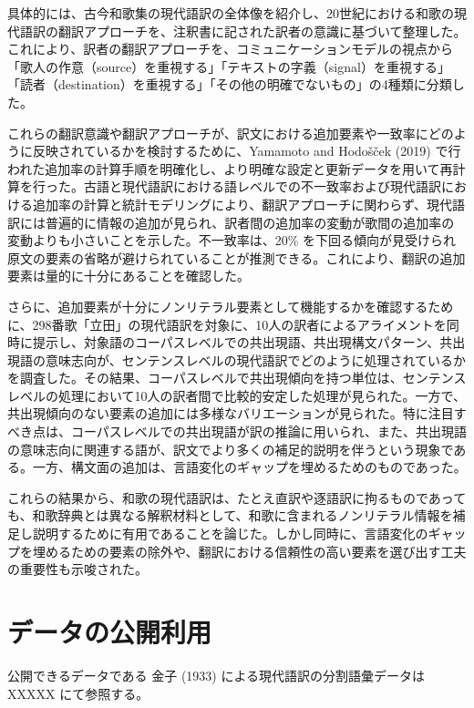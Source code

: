 \documentclass[
  letterpaper,
  DIV=11,
  numbers=noendperiod]{scrartcl}
\begin{document}
具体的には、古今和歌集の現代語訳の全体像を紹介し、20世紀における和歌の現代語訳の翻訳アプローチを、注釈書に記された訳者の意識に基づいて整理した。これにより、訳者の翻訳アプローチを、コミュニケーションモデルの視点から「歌人の作意（source）を重視する」「テキストの字義（signal）を重視する」「読者（destination）を重視する」「その他の明確でないもの」の4種類に分類した。

これらの翻訳意識や翻訳アプローチが、訳文における追加要素や一致率にどのように反映されているかを検討するために、Yamamoto
and Hodošček (2019)
で行われた追加率の計算手順を明確化し、より明確な設定と更新データを用いて再計算を行った。古語と現代語訳における語レベルでの不一致率および現代語訳における追加率の計算と統計モデリングにより、翻訳アプローチに関わらず、現代語訳には普遍的に情報の追加が見られ、訳者間の追加率の変動が歌間の追加率の変動よりも小さいことを示した。不一致率は、20\%
を下回る傾向が見受けられ原文の要素の省略が避けられていることが推測できる。これにより、翻訳の追加要素は量的に十分にあることを確認した。

さらに、追加要素が十分にノンリテラル要素として機能するかを確認するために、298番歌「立田」の現代語訳を対象に、10人の訳者によるアライメントを同時に提示し、対象語のコーパスレベルでの共出現語、共出現構文パターン、共出現語の意味志向が、センテンスレベルの現代語訳でどのように処理されているかを調査した。その結果、コーパスレベルで共出現傾向を持つ単位は、センテンスレベルの処理において10人の訳者間で比較的安定した処理が見られた。一方で、共出現傾向のない要素の追加には多様なバリエーションが見られた。特に注目すべき点は、コーパスレベルでの共出現語が訳の推論に用いられ、また、共出現語の意味志向に関連する語が、訳文でより多くの補足的説明を伴うという現象である。一方、構文面の追加は、言語変化のギャップを埋めるためのものであった。

これらの結果から、和歌の現代語訳は、たとえ直訳や逐語訳に拘るものであっても、和歌辞典とは異なる解釈材料として、和歌に含まれるノンリテラル情報を補足し説明するために有用であることを論じた。しかし同時に、言語変化のギャップを埋めるための要素の除外や、翻訳における信頼性の高い要素を選び出す工夫の重要性も示唆された。

\section*{データの公開利用}\label{ux30c7ux30fcux30bfux306eux516cux958bux5229ux7528}

公開できるデータである 金子 (1933) による現代語訳の分割語彙データは
XXXXX にて参照する。
\end{document}

